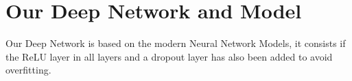 \section{Our Deep Network and Model} \label{sec:build6}

Our Deep Network is based on the modern Neural Network Models, it consists if the ReLU layer in all layers and a dropout layer has also been added to avoid overfitting.